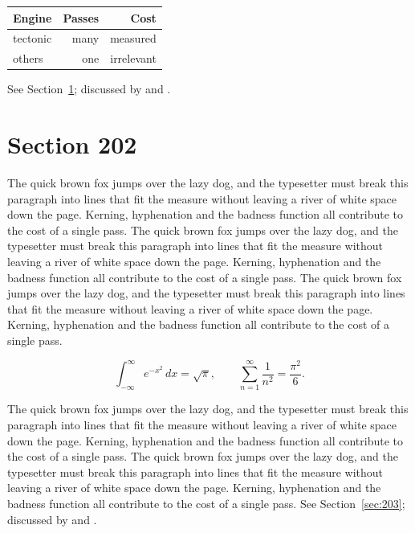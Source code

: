 \documentclass{article}
\begin{document}
\begin{center}
\begin{tabular}{lrr}
\toprule
Engine & Passes & Cost \\
\midrule
tectonic & many & measured \\
others & one & irrelevant \\
\bottomrule
\end{tabular}
\end{center}

See Section~\ref{sec:202}; discussed by \textcite{k2} and \textcite{l4}.
\section{Section 202}
\label{sec:202}
The quick brown fox jumps over the lazy dog, and the typesetter must break this paragraph into lines that fit the measure without leaving a river of white space down the page. Kerning, hyphenation and the badness function all contribute to the cost of a single pass. The quick brown fox jumps over the lazy dog, and the typesetter must break this paragraph into lines that fit the measure without leaving a river of white space down the page. Kerning, hyphenation and the badness function all contribute to the cost of a single pass. The quick brown fox jumps over the lazy dog, and the typesetter must break this paragraph into lines that fit the measure without leaving a river of white space down the page. Kerning, hyphenation and the badness function all contribute to the cost of a single pass. 

\begin{equation}\label{eq:202}
\int_{-\infty}^{\infty} e^{-x^{2}}\,dx = \sqrt{\pi}, \qquad
\sum_{n=1}^{\infty} \frac{1}{n^{2}} = \frac{\pi^{2}}{6}.
\end{equation}

The quick brown fox jumps over the lazy dog, and the typesetter must break this paragraph into lines that fit the measure without leaving a river of white space down the page. Kerning, hyphenation and the badness function all contribute to the cost of a single pass. The quick brown fox jumps over the lazy dog, and the typesetter must break this paragraph into lines that fit the measure without leaving a river of white space down the page. Kerning, hyphenation and the badness function all contribute to the cost of a single pass. 
See Section~\ref{sec:203}; discussed by \textcite{k3} and \textcite{l5}.
\end{document}
